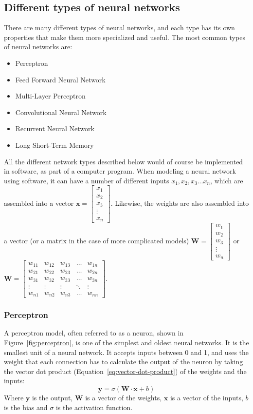 \documentclass[titlepage]{article}
\begin{document}
\subsection{Different types of neural networks}
There are many different types of neural networks, and each type has its own properties that make them more specialized and useful. The most common types of neural networks are:
\begin{itemize}
    \item Perceptron
    \item Feed Forward Neural Network
    \item Multi-Layer Perceptron
    \item Convolutional Neural Network
    \item Recurrent Neural Network
    \item Long Short-Term Memory
\end{itemize} 
All the different network types described below would of course be implemented in software, as part of a computer program. When modeling a neural network using software, it can have a number of different inputs $x_1, x_2, x_3 ... x_n$, which are assembled into a vector $\textbf{x}=\begin{bmatrix}x_1\\x_2\\x_3\\\vdots\\x_n\end{bmatrix}$. Likewise, the weights are also assembled into a vector (or a matrix in the case of more complicated models) $\textbf{W}=\begin{bmatrix}w_1\\w_2\\w_3\\\vdots\\w_n\end{bmatrix}$ or $\textbf{W}=\begin{bmatrix}w_{11}&w_{12}&w_{13}&\dots&w_{1n}\\w_{21}&w_{22}&w_{23}&\dots&w_{2n}\\w_{31}&w_{32}&w_{33}&\dots&w_{3n}\\\vdots&\vdots&\vdots&\ddots&\vdots\\w_{n1}&w_{n2}&w_{n3}&\dots&w_{nn}\end{bmatrix}$.
\subsubsection{Perceptron}
A perceptron model, often referred to as a neuron, shown in Figure~\ref{fig:perceptron}, is one of the simplest and oldest neural networks. It is the smallest unit of a neural network. It accepts inputs between 0 and 1, and uses the weight that each connection has to calculate the output of the neuron by taking the vector dot product (Equation~\ref{eq:vector-dot-product}) of the weights and the inputs:
\begin{equation}
    \textbf{y} = \sigma(\textbf{W}\cdot\textbf{x} + b)
    \label{eq:perceptron}
\end{equation}
Where $\textbf{y}$ is the output, $\textbf{W}$ is a vector of the weights, $\textbf{x}$ is a vector of the inputs, $b$ is the bias and $\sigma$ is the activation function.
\end{document}
